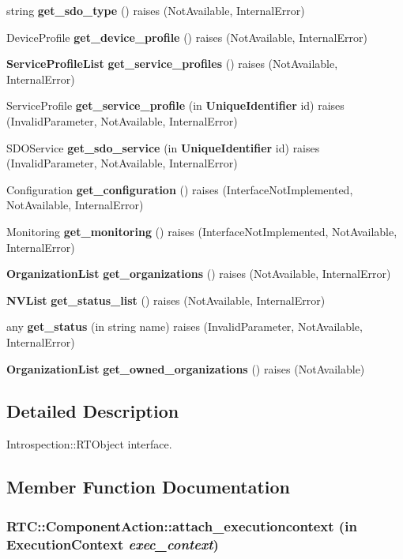 \begin{CompactItemize}
\item 
string {\bf get\_\-sdo\_\-type} ()  raises (Not\-Available, Internal\-Error)
\item 
Device\-Profile {\bf get\_\-device\_\-profile} ()  raises (Not\-Available, Internal\-Error)
\item 
{\bf Service\-Profile\-List} {\bf get\_\-service\_\-profiles} ()  raises (Not\-Available, Internal\-Error)
\item 
Service\-Profile {\bf get\_\-service\_\-profile} (in {\bf Unique\-Identifier} id)  raises (Invalid\-Parameter, Not\-Available, Internal\-Error)
\item 
SDOService {\bf get\_\-sdo\_\-service} (in {\bf Unique\-Identifier} id)  raises (Invalid\-Parameter, Not\-Available, Internal\-Error)
\item 
Configuration {\bf get\_\-configuration} ()  raises (Interface\-Not\-Implemented, Not\-Available, Internal\-Error)
\item 
Monitoring {\bf get\_\-monitoring} ()  raises (Interface\-Not\-Implemented, Not\-Available, Internal\-Error)
\item 
{\bf Organization\-List} {\bf get\_\-organizations} ()  raises (Not\-Available, Internal\-Error)
\item 
{\bf NVList} {\bf get\_\-status\_\-list} ()  raises (Not\-Available, Internal\-Error)
\item 
any {\bf get\_\-status} (in string name)  raises (Invalid\-Parameter, Not\-Available, Internal\-Error)
\item 
{\bf Organization\-List} {\bf get\_\-owned\_\-organizations} ()  raises (Not\-Available)
\end{CompactItemize}


\subsection{Detailed Description}
Introspection::RTObject interface. 



\subsection{Member Function Documentation}
\subsubsection{ RTC::Component\-Action::attach\_\-executioncontext (in {\bf Execution\-Context} {\em exec\_\-context})\hspace{0.3cm}{\tt  [inherited]}}\label{interfaceRTC_1_1ComponentAction_RTC_1_1RTObjecta9}


